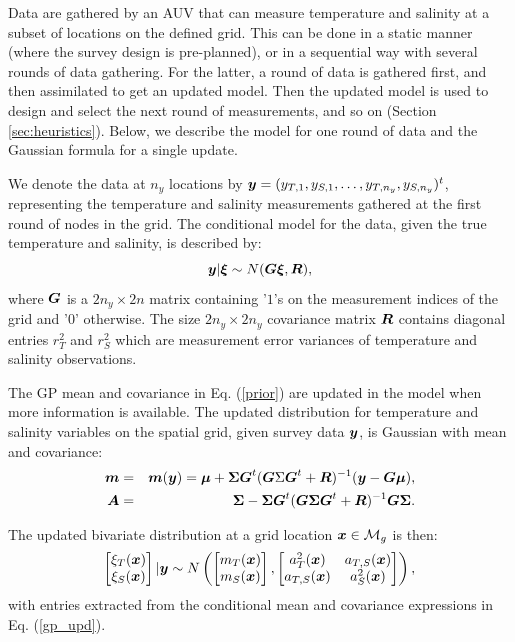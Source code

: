 \documentclass[aoas]{imsart}
\begin{document}
Data are gathered by an AUV that can measure temperature and salinity
at a subset of locations on the defined grid. This can be done in a
static manner (where the survey design is pre-planned), or in a
sequential way with several rounds of data gathering. For the latter,
a round of data is gathered first, and then assimilated to get an
updated model. Then the updated model is used to design and select the
next round of measurements, and so on (Section
\ref{sec:heuristics}). Below, we describe the model for one round of
data and the Gaussian formula for a single update.

We denote the data at $n_y$ locations by
${\boldsymbol y}=(y_{T,1},y_{S,1},\ldots,y_{T,n_y},y_{S,n_y})^t$, representing the
temperature and salinity measurements gathered at the first round of
nodes in the grid. The conditional model for the data, given the true temperature
and salinity, is described by: 
\begin{equation}\label{likelihood}
\by | \bxi \sim N( \bG \bxi, \bR), %
\end{equation}
where ${\boldsymbol G}$ is a $2n_y \times 2n$ matrix containing '$1$'s on the
measurement indices of the grid and '$0$' otherwise. The size
$2n_y \times 2n_y$ covariance matrix ${\boldsymbol R}$ contains diagonal entries
$r^2_T$ and $r^2_S$ which are measurement error variances of
temperature and salinity observations.

The GP mean and covariance in Eq. (\ref{prior}) are updated in the
model when more information is available. The updated distribution for
temperature and salinity variables on the spatial grid, given survey
data ${\boldsymbol y}$, is Gaussian with mean and covariance:
\begin{eqnarray}\label{gp_upd}
  \bm &=& \bm(\by) = \bmu+\bSigma \bG^t (\bG \Sigma \bG^t+\bR)^{-1}(\by-\bG \bmu),  \\
  \bA &=& \bSigma - \bSigma \bG^t (\bG \bSigma \bG^t+\bR)^{-1} \bG
          \bSigma.\nonumber
\end{eqnarray}

The updated bivariate distribution at a grid location ${\boldsymbol x} \in
\mathcal{M}_g$ is then: 
\begin{equation}\label{gp_hat}
\begin{bmatrix}
\xi_T(\bx) \\
\xi_S(\bx)
\end{bmatrix}
 |\by
 \sim N \left( 
\begin{bmatrix} m_{T}(\bx)\\
m_{S}(\bx)
\end{bmatrix},\begin{bmatrix}
a_{T}^2(\bx) & a_{T,S}(\bx)  \\
a_{T,S}(\bx)  & a_{S}^2(\bx)  
\end{bmatrix}
\right),
\end{equation}
with entries extracted from the conditional mean and covariance
expressions in Eq. (\ref{gp_upd}).
\end{document}
